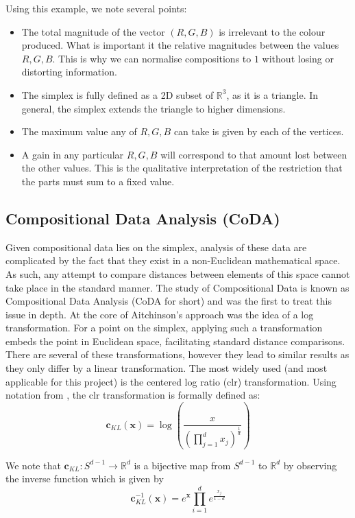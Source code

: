 Using this example, we note several points: 
\begin{itemize}
    \item The total magnitude of the vector $(R,G,B)$ is irrelevant to the colour produced. What is important it the relative magnitudes between the values $R,G,B$. This is why we can normalise compositions to $1$ without losing or distorting information.   
    \item The simplex is fully defined as a 2D subset of $\mathbb{R}^3$, as it is a triangle. In general, the simplex extends the triangle to higher dimensions.  
    \item The maximum value any of $R,G,B$ can take is given by each of the vertices.
    \item A gain in any particular $R,G,B$ will correspond to that amount lost between the other values. This is the qualitative interpretation of the restriction that the parts must sum to a fixed value. 
\end{itemize}
\pagebreak



 
\subsection{Compositional Data Analysis (CoDA)}
\label{coda}
Given compositional data lies on the simplex, analysis of these data are complicated by the fact that they exist in a non-Euclidean mathematical space. As such, any attempt to compare distances between elements of this space cannot take place in the standard manner. The study of Compositional Data is known as Compositional Data Analysis (CoDA for short) and \cite{Aitchison1982} was the first to treat this issue in depth. At the core of Aitchinson's approach was the idea of a log transformation. For a point on the simplex, applying such a transformation embeds the point in Euclidean space, facilitating standard distance comparisons. There are several of these transformations, however they lead to similar results as they only differ by a linear transformation. The most widely used (and most applicable for this project) is the centered log ratio (clr) transformation. Using notation from \cite{Avalos2018}, the clr transformation is formally defined as: $$\mathbf{c}_{KL}(\mathbf{x}) = \log \left(\frac{x}{(\prod_{j=1}^d x_j)^{\frac{1}{d}}}\right)$$  

We note that $\mathbf{c}_{KL} : S^{d-1} \to  \mathbb{R}^d$ is a bijective map from $S^{d-1}$ to  $\mathbb{R}^d$ by observing the inverse function which is given by 
$$\mathbf{c}_{KL}^{-1}(\mathbf{x}) = e^\mathbf{x} \prod_{i=1}^d e^{\frac{x_j}{1-d}}$$

